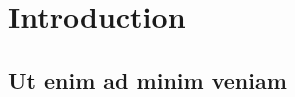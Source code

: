 \chapter{Introduction}
\setcounter{page}{1}



\lipsum[4]

\section{Ut enim ad minim veniam}

\lipsum[6-8]

